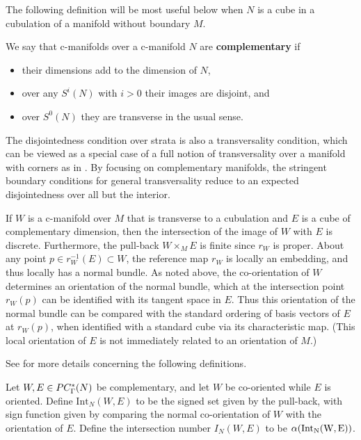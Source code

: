 The following definition will be most useful below when $N$ is a cube in a cubulation of a manifold without boundary $M$.

\begin{definition}\label{D:complementary}
	We say that c-manifolds over a c-manifold $N$ are \textbf{complementary} if
	\begin{itemize}
		\item their dimensions add to the dimension of $N$,
		\item over any $S^i(N)$ with $i>0$ their images are disjoint, and
		\item over $S^0(N)$ they are transverse in the usual sense.
	\end{itemize}
\end{definition}

The disjointedness condition over strata is also a transversality condition, which can be viewed as a special case of a full notion of transversality over a manifold with corners as in \cite{Joy12}.
By focusing on complementary manifolds, the stringent boundary conditions for general transversality reduce to an expected disjointedness over all but the interior.

If $W$ is a c-manifold over $M$ that is transverse to a cubulation and $E$ is a cube of complementary dimension, then the intersection of the image of $W$ with $E$ is discrete.
Furthermore, the pull-back $W \times_M E$ is finite since $r_W$ is proper.
About any point $p \in r_W^{-1}(E) \subset W$, the reference map $r_W$ is locally an embedding, and thus locally has a normal bundle.
As noted above, the co-orientation of $W$ determines an orientation of the normal bundle, which at the intersection point $r_W(p)$ can be identified with its tangent space in $E$.
Thus this orientation of the normal bundle can be compared with the standard ordering of basis vectors of $E$ at $r_W(p)$, when identified with a standard cube via its characteristic map.
(This local orientation of $E$ is not immediately related to an orientation of $M$.)

See \cite[Section 6.5]{medina2022foundations} for more details concerning the following definitions.

\begin{definition}\label{D:intersection number}
	Let $W, E \in PC_\Gamma^*({N})$ be complementary, and let $W$ be co-oriented while $E$ is oriented.
	Define $\mathrm{Int}_N(W, E)$ to be the signed set given by the pull-back, with sign function given by comparing the normal co-orientation of $W$ with the orientation of $E$.
	Define the intersection number $I_N(W,E)$ to be $\alpha(\rm{Int}_N(W, E))$.
\end{definition}

